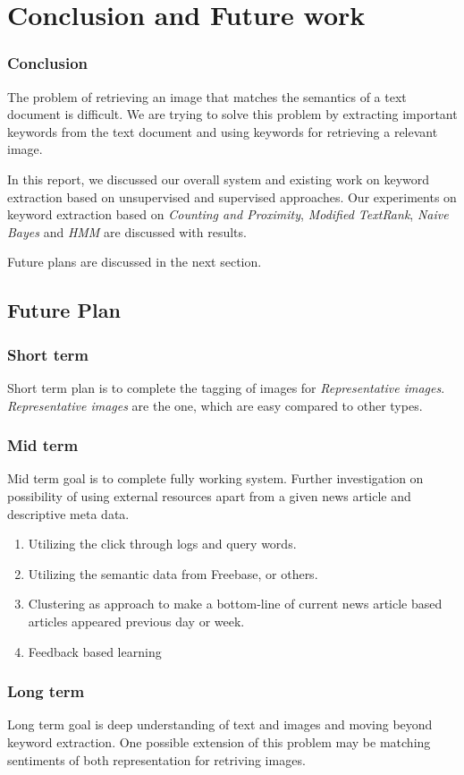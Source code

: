 \chapter{Conclusion and Future work}

\subsection{Conclusion}

The problem of retrieving an image that matches the semantics of a text document is difficult. We are trying to solve this problem by extracting important keywords from the text document and using keywords for retrieving a relevant image. 

In this report, we discussed our overall system and existing work on keyword extraction based on unsupervised and supervised approaches. Our experiments on keyword extraction based on \textit{Counting and Proximity}, \textit{Modified TextRank}, \textit{Naive Bayes} and \textit{HMM} are discussed with results.


Future plans are discussed in the next section.

\section{Future Plan}

\subsection{Short term}
Short term plan is to complete the tagging of images for \textit{Representative images}. \textit{Representative images} are the one, which are easy compared to other types. 

\subsection{Mid term}

Mid term goal is to complete fully working system. Further investigation on possibility of using external resources apart from a given news article and descriptive meta data.
\begin{enumerate}
\item{Utilizing the click through logs and query words.}
\item{Utilizing the semantic data from Freebase, or others.}
\item{Clustering as approach to make a bottom-line of current news article based articles appeared previous day or week.}
\item{Feedback based learning }
\end{enumerate}


\subsection{Long term}

Long term goal is deep understanding of text and images and moving beyond keyword extraction. One possible extension of this problem may be matching sentiments of both representation for retriving images.




